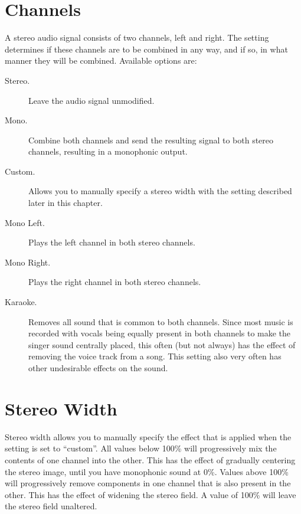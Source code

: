 \section{Channels}
  A stereo audio signal consists of two channels, left and right. The
   setting determines if these channels are to be combined in
  any way, and if so, in what manner they will be combined.
  Available options are:
  \begin{description}
      \item[Stereo.]
          Leave the audio signal unmodified.
      \item[Mono.]
          Combine both channels and send the resulting signal to both stereo
          channels, resulting in a monophonic output.
      \item[Custom.]
          Allows you to manually specify a stereo width with the
           setting described later in this chapter.
      \item[Mono Left.]
          Plays the left channel in both stereo channels.
      \item[Mono Right.]
          Plays the right channel in both stereo channels.
      \item[Karaoke.]
          Removes all sound that is common to both channels. Since most
          music is recorded with vocals being equally present in both channels
          to make the singer sound centrally placed, this often (but not 
          always) has the effect of removing the voice track from a song. This 
          setting also very often has other undesirable effects on the sound.
  \end{description}

\section{Stereo Width}
  Stereo width allows you to manually specify the effect that is applied
  when the  setting is set to ``custom''.
  All values below 100\% will progressively mix the contents of one channel
  into the other. This has the effect of gradually centering the stereo image,
  until you have monophonic sound at 0\%. Values above 100\% will progressively
  remove components in one channel that is also present in the other. This has
  the effect of widening the stereo field. A value of 100\% will leave the
  stereo field unaltered.

  
